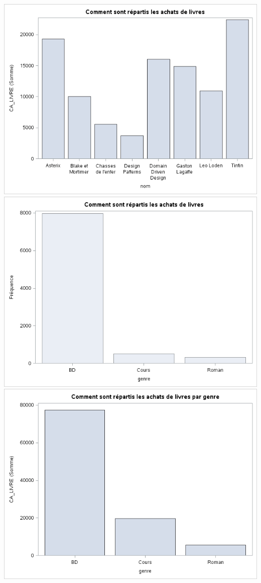 \includegraphics[scale=0.7]{./images/sas_report/sas_report_6.png}
\includegraphics[scale=0.7]{./images/sas_report/sas_report_7.png}
\includegraphics[scale=0.7]{./images/sas_report/sas_report_8.png}
